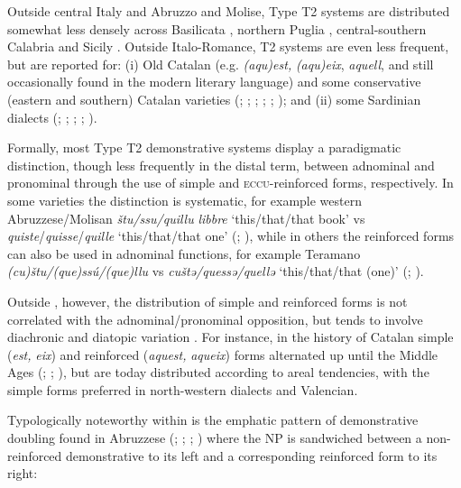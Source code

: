 \documentclass[output=paper]{langsci/langscibook}
\begin{document}
Outside central Italy and Abruzzo and Molise, Type T2 systems are distributed
somewhat less densely across Basilicata \citep[29]{Ludtke:1979a}, northern
Puglia \citep[27, 60]{Valente:1975a}, central-southern Calabria \citep[92 n.41,
107]{ledgeway2004sviluppo} and Sicily \citep[29, 41]{Leone:1995a}. Outside
Italo-Romance, T2 systems are even less frequent, but are reported for: (i) Old
Catalan (e.g. \emph{(aqu)est,} \emph{(aqu)eix}, \emph{aquell}, and still
occasionally found in the modern literary language) and some conservative
(eastern and southern) Catalan varieties
(\citealt[500f]{Badia-i-Margarit:1995a};
\citealt[81]{Duarte-i-Montserrat:1986a}; \citealt[256]{Veny:1991a};
\citealt[107]{Wheeler:1999a}; \citealt[179]{Moll:2006a};
\citealt[208f]{Nogue-Serrano:2015a}); and (ii) some Sardinian dialects
(\citealt[839]{Blasco-Ferrer:1988a}; \citealt[34, 203]{Jones:1993a};
\citealt[44]{Corda:1994a};
\citealt[§3.6]{Da-Milano:2007a}; \citealt[48]{Putzu:2015a}).

Formally, most  Type T2 demonstrative systems display a
para\-digmatic distinction, though less frequently in the distal term, between
adnominal and pronominal  through the use of simple and
\textsc{eccu}-re\-in\-forced forms, respectively. In some varieties the
distinction is systematic, for example western Abruzzese/Molisan \emph{štu/ssu/quillu}
\emph{libbre} ‘this/that/that book’ vs
\emph{quis\-te}/\emph{quis\-se}/\emph{quil\-le} ‘this/that/that one’
(\citealt[22]{Finamore:1893a}; \citealt[647]{Marinucci:1988a}), while in others
the reinforced forms can also be used in adnominal functions, for example Teramano
\emph{(cu)štu/(que)ssú/(que)llu} vs \emph{cuštə/quessə/quellə} ‘this/that/that
(one)’ (\citealt[62]{Savini:1881a}; \citealt{Mantenuto:2016a}).

Outside , however, the distribution of simple and reinforced forms
is not correlated with the adnominal/pronominal opposition, but tends to
involve diachronic and diatopic variation
\citep[§§2.1.1--4]{Sornicola:2011a}. For instance, in the
history of Catalan simple (\emph{est,} \emph{eix}) and reinforced
(\emph{aquest,} \emph{aqueix}) forms alternated up until the Middle Ages
(\citealt[141]{Badia-i-Margarit:1991a};
\citealt[79f]{Duarte-i-Montserrat:1986a}; \citealt[179]{Moll:2006a}), but are
today distributed according to areal tendencies, with the simple forms
preferred in north-western dialects and Valencian.

Typologically noteworthy within  is the emphatic pattern of
demonstrative doubling found in Abruzzese (\citealt[62]{Savini:1881a};
\citealt[22]{Finamore:1893a}; \citealt[209]{Rohlfs:1968a};
\citealt[48f]{Verratti:1968a}) where the NP is sandwiched between a
non-reinforced demonstrative to its left and a corresponding reinforced form to
its right:
\end{document}
